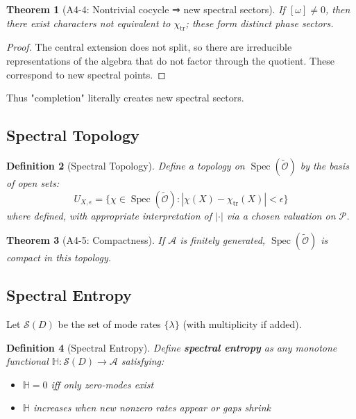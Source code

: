 \documentclass[12pt, oneside]{article}
\newtheorem{theorem}{Theorem}[section]
\newtheorem{definition}[theorem]{Definition}
\DeclareMathOperator{\tr}{tr}
\DeclareMathOperator{\Spec}{Spec}
\newcommand{\A}{\mathcal{A}}
\newcommand{\Opr}{\mathcal{O}}
\newcommand{\wtilde}{\widetilde}
\begin{document}
\begin{theorem}[A4-4: Nontrivial cocycle ⇒ new spectral sectors]
If $[\omega] \neq 0$, then there exist characters not equivalent to $\chi_{\tr}$; these form distinct phase sectors.
\end{theorem}

\begin{proof}
The central extension does not split, so there are irreducible representations of the algebra that do not factor through the quotient. These correspond to new spectral points.
\end{proof}

Thus "completion" literally creates new spectral sectors.

\subsection{Spectral Topology}

\begin{definition}[Spectral Topology]
Define a topology on $\Spec(\wtilde{\Opr})$ by the basis of open sets:
\begin{equation}
U_{X,\epsilon} = \{ \chi \in \Spec(\wtilde{\Opr}) : |\chi(X) - \chi_{\tr}(X)| < \epsilon \}
\end{equation}
where defined, with appropriate interpretation of $|\cdot|$ via a chosen valuation on $\mathcal{P}$.
\end{definition}

\begin{theorem}[A4-5: Compactness]
If $\A$ is finitely generated, $\Spec(\wtilde{\Opr})$ is compact in this topology.
\end{theorem}

\subsection{Spectral Entropy}

Let $\mathcal{S}(D)$ be the set of mode rates $\{\lambda\}$ (with multiplicity if added).

\begin{definition}[Spectral Entropy]
Define \textbf{spectral entropy} as any monotone functional $\mathbb{H}: \mathcal{S}(D) \rightarrow \A$ satisfying:
\begin{itemize}
    \item $\mathbb{H} = 0$ iff only zero-modes exist
    \item $\mathbb{H}$ increases when new nonzero rates appear or gaps shrink
\end{itemize}
\end{definition}
\end{document}
